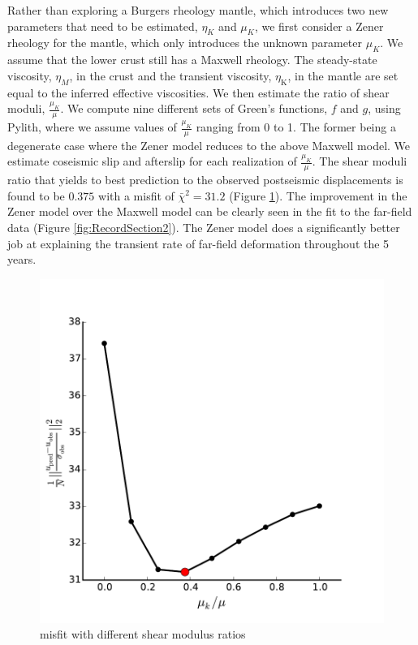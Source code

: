 \documentclass[1p]{elsarticle}
\begin{document}
Rather than exploring a Burgers rheology mantle, which introduces two new parameters that need to be estimated, $\eta_{K}$ and $\mu_{K}$, we first consider a Zener rheology for the mantle, which only introduces the unknown parameter $\mu_{K}$.  We assume that the lower crust still has a Maxwell rheology. The steady-state viscosity, $\eta_{M}$, in the crust and the transient viscosity, $\eta_\mathrm{K}$, in the mantle are set equal to the inferred effective viscosities.  We then estimate the ratio of shear moduli, $\frac{\mu_K}{\mu}$. We compute nine different sets of Green's functions, $f$ and $g$, using Pylith, where we assume values of $\frac{\mu_K}{\mu}$ ranging from 0 to 1. The former being a degenerate case where the Zener model reduces to the above Maxwell model.  We estimate coseismic slip and afterslip for each realization of $\frac{\mu_K}{\mu}$.  The shear moduli ratio that yields to best prediction to the observed postseismic displacements is found to be $0.375$ with a misfit of $\bar\chi^2=31.2$ (Figure \ref{fig:ShearModulusRatio}).  The improvement in the Zener model over the Maxwell model can be clearly seen in the fit to the far-field data (Figure \ref{fig:RecordSection2}). The Zener model does a significantly better job at explaining the transient rate of far-field deformation throughout the 5 years.  

\begin{figure}
\includegraphics[scale=0.8]{Figures/RatioMisfit}
\centering 
\caption{misfit with different shear modulus ratios}
\label{fig:ShearModulusRatio}
\end{figure}
\end{document}
